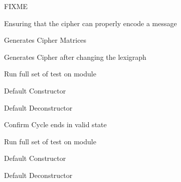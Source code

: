 \begin{DoxyRefList}
%
FIXME  
\item[Member \mbox{\hyperlink{classTestCiphers_a1946966427de5adbd6c94c12590d1adb}{Test\+Ciphers\+::encode}} ()]\label{todo__todo000203}%
%
Ensuring that the cipher can properly encode a message  
\item[Member \mbox{\hyperlink{classTestCiphers_aa23fbf645240cdb2d536408e98aa93aa}{Test\+Ciphers\+::generate\+Matrix}} ()]\label{todo__todo000204}%
%
Generates Cipher Matrices\textquotesingle{}  
\item[Member \mbox{\hyperlink{classTestCiphers_a98f84a007ac2305e2e15346791b5cbcb}{Test\+Ciphers\+::swapped\+Lexigraph}} ()]\label{todo__todo000205}%
%
Generates Cipher after changing the lexigraph  
\item[Member \mbox{\hyperlink{classTestCiphers_ad80c007f03203bd89adc7118219ecdf2}{Test\+Ciphers\+::test\+\_\+all}} ()]\label{todo__todo000200}%
%
Run full set of test on module  
\item[Member \mbox{\hyperlink{classTestCiphers_a45676e93aada4e8ebcf08a96c4df5cac}{Test\+Ciphers\+::Test\+Ciphers}} ()]\label{todo__todo000199}%
%
Default Constructor  
\item[Member \mbox{\hyperlink{classTestCiphers_a5626991edfad49b7e74fdf0a213f2492}{Test\+Ciphers\+::$\sim$\+Test\+Ciphers}} ()]\label{todo__todo000206}%
%
Default Deconstructor  
\item[Member \mbox{\hyperlink{classTestClock_a9e28c3baa6fc61f12d5d259e23961188}{Test\+Clock\+::do\+Cycle\+Work}} ()]\label{todo__todo000209}%
%
Confirm Cycle ends in valid state  
\item[Member \mbox{\hyperlink{classTestClock_a17a7ecaa15c797b28041f38d725d4ad2}{Test\+Clock\+::test\+\_\+all}} ()]\label{todo__todo000208}%
%
Run full set of test on module  
\item[Member \mbox{\hyperlink{classTestClock_ab695f04527560524152ed78dabe4d2a9}{Test\+Clock\+::Test\+Clock}} ()]\label{todo__todo000207}%
%
Default Constructor  
\item[Member \mbox{\hyperlink{classTestClock_a2d427de10a85065874608a0626813a19}{Test\+Clock\+::$\sim$\+Test\+Clock}} ()]\label{todo__todo000210}%
%
Default Deconstructor  
\item[Member \mbox{\hyperlink{classTestCombat_a19bc46109de13a441fc23955d5a6963b}{Test\+Combat\+::EVECombat}} ()]\label{todo__todo000213}%

\end{DoxyRefList}
